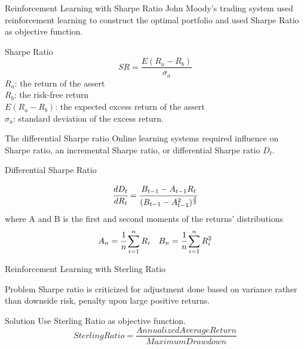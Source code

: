 \begin{frame}{Reinforcement Learning with Sharpe Ratio}
John Moody's trading system used reinforcement learning to construct the optimal portfolio and used Sharpe Ratio as objective function.

\begin{block}{Sharpe Ratio}
\[ SR = \frac{E(R_a - R_b)}{\sigma_a}\]
\(R_a\): the return of the assert
\\
\(R_b\): the risk-free return
\\
\(E(R_a - R_b)\): the expected excess return of the assert
\\
\(\sigma_a\): standard deviation of the excess return.
\end{block}

\end{frame}
\begin{frame}{The differential Sharpe ratio}
Online learning systems required influence on Sharpe ratio, an incremental Sharpe ratio, or differential Sharpe ratio \(D_t\).
\begin{block}{Differential Sharpe Ratio}

\[
\cfrac{d D_t}{d R_t} = 
\cfrac{B_{t-1}-A_{t-1} R_t}{(B_{t-1}-A_{t-1}^2)^\frac{3}{2}}
\]
where
A and B is the first and second moments of the returns' distributions
\[ A_n = \cfrac{1}{n}\sum_{i=1}^nR_i\quad
B_n = \cfrac{1}{n}\sum_{i=1}^nR_i^2
\]
\end{block}
\end{frame}
\begin{frame}{Reinforcement Learning with Sterling Ratio}
\begin{block}{Problem}
Sharpe ratio is criticized for adjustment done based on variance rather than downside risk, penalty upon large positive returns.
\end{block}
\begin{block}{Solution}
Use Sterling Ratio as objective function.
\[
Sterling Ratio=\frac{Annualized Average Return}{Maximum Drawdown}
\]
\end{block}

\end{frame}

